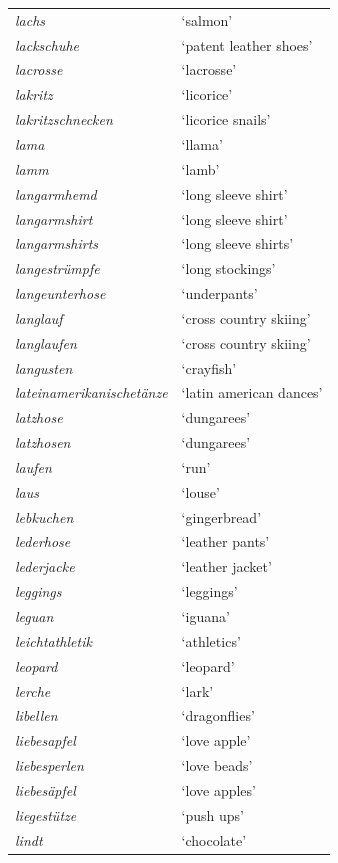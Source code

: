\begin{longtable}{ll}
\textit{lachs} & `salmon' \\
\textit{lackschuhe} & `patent leather shoes' \\
\textit{lacrosse} & `lacrosse' \\
\textit{lakritz} & `licorice' \\
\textit{lakritzschnecken} & `licorice snails' \\
\textit{lama} & `llama' \\
\textit{lamm} & `lamb' \\
\textit{langarmhemd} & `long sleeve shirt' \\
\textit{langarmshirt} & `long sleeve shirt' \\
\textit{langarmshirts} & `long sleeve shirts' \\
\textit{langestrümpfe} & `long stockings' \\
\textit{langeunterhose} & `underpants' \\
\textit{langlauf} & `cross country skiing' \\
\textit{langlaufen} & `cross country skiing' \\
\textit{langusten} & `crayfish' \\
\textit{lateinamerikanischetänze} & `latin american dances' \\
\textit{latzhose} & `dungarees' \\
\textit{latzhosen} & `dungarees' \\
\textit{laufen} & `run' \\
\textit{laus} & `louse' \\
\textit{lebkuchen} & `gingerbread' \\
\textit{lederhose} & `leather pants' \\
\textit{lederjacke} & `leather jacket' \\
\textit{leggings} & `leggings' \\
\textit{leguan} & `iguana' \\
\textit{leichtathletik} & `athletics' \\
\textit{leopard} & `leopard' \\
\textit{lerche} & `lark' \\
\textit{libellen} & `dragonflies' \\
\textit{liebesapfel} & `love apple' \\
\textit{liebesperlen} & `love beads' \\
\textit{liebesäpfel} & `love apples' \\
\textit{liegestütze} & `push ups' \\
\textit{lindt} & `chocolate' \\

\end{longtable}
